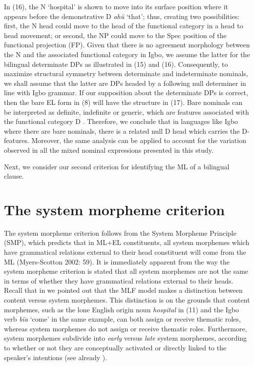 \documentclass[output=paper]{langsci/langscibook}
\begin{document}
In (16), the N ‘hospital’ is shown to move into its surface position where it appears before the demonstrative D \textit{ahü }‘that’; thus, creating two possibilities: first, the N head could move to the head of the functional category in a head to head movement; or second, the NP could move to the Spec position of the functional projection (FP). Given that there is no agreement morphology between the N and the associated functional category in Igbo, we assume the latter for the bilingual determinate DPs as illustrated in (15) and (16). Consequently, to maximize structural symmetry between determinate and indeterminate nominals, we shall assume that the latter are DPs headed by a following null determiner in line with Igbo grammar. If our supposition about the determinate DPs is correct, then the bare EL form in (8) will have the structure in (17). Bare nominals can be interpreted as definite, indefinite or generic, which are features associated with the functional category D \citep{Radford2004}. Therefore, we conclude that in languages like Igbo where there are bare nominals, there is a related null D head which carries the D-features. Moreover, the same analysis can be applied to account for the variation observed in all the mixed nominal expressions presented in this study. 

Next, we consider our second criterion for identifying the ML of a bilingual clause.

\section{The system morpheme criterion}

The system morpheme criterion follows from the System Morpheme Principle (SMP), which predicts that in ML+EL constituents, all system morphemes which have grammatical relations external to their head constituent will come from the ML (Myers-Scotton 2002: 59). It is immediately apparent from the way the system morpheme criterion is stated that all system morphemes are not the same in terms of whether they have grammatical relations external to their heads. Recall that in  we pointed out that the MLF model makes a distinction between content versus system morphemes. This distinction is on the grounds that content morphemes, such as the lone English origin noun \textit{hospital }in (11) and the Igbo verb \textit{bïa }‘come’ in the same example, can both assign or receive thematic roles, whereas system morphemes do not assign or receive thematic roles. Furthermore, system morphemes subdivide into \textit{early} versus \textit{late} system morphemes, according to whether or not they are conceptually activated or directly linked to the speaker’s intentions (see already ). 
\end{document}
